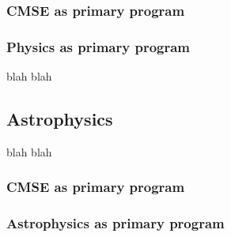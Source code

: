\subsubsection{CMSE as primary program}

\subsubsection{Physics as primary program}

blah blah

\subsection{Astrophysics}

blah blah

\subsubsection{CMSE as primary program}


\subsubsection{Astrophysics as primary program}
